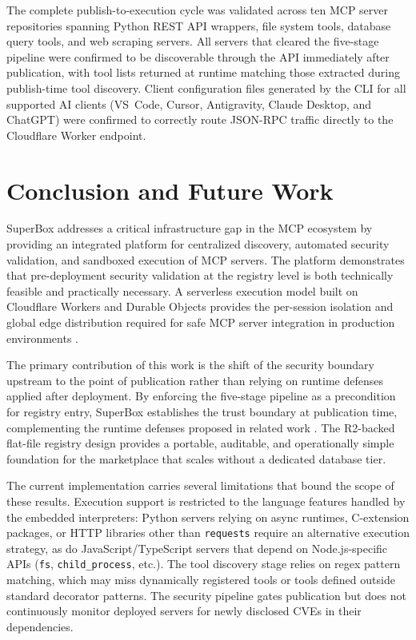 \documentclass[conference]{IEEEtran}
\begin{document}
The complete publish-to-execution cycle was validated across ten MCP
server repositories spanning Python REST API wrappers, file system
tools, database query tools, and web scraping servers.
All servers that cleared the five-stage pipeline were confirmed to be
discoverable through the API immediately after publication, with tool
lists returned at runtime matching those extracted during publish-time
tool discovery.
Client configuration files generated by the CLI for all supported AI
clients (VS~Code, Cursor, Antigravity, Claude Desktop, and ChatGPT)
were confirmed to correctly route JSON-RPC traffic directly to the
Cloudflare Worker endpoint.

\section{Conclusion and Future Work}
\label{sec:conclusion}

SuperBox addresses a critical infrastructure gap in the MCP ecosystem
by providing an integrated platform for centralized discovery, automated
security validation, and sandboxed execution of MCP servers.
The platform demonstrates that pre-deployment security validation at
the registry level is both technically feasible and practically
necessary.
A serverless execution model built on Cloudflare Workers and Durable
Objects provides the per-session isolation and global edge distribution
required for safe MCP server integration in production
environments \cite{jonas2019}.

The primary contribution of this work is the shift of the security
boundary upstream to the point of publication rather than relying on
runtime defenses applied after deployment.
By enforcing the five-stage pipeline as a precondition for registry
entry, SuperBox establishes the trust boundary at publication time,
complementing the runtime defenses proposed in related
work \cite{jamshidi2025,narajala2025}.
The R2-backed flat-file registry design provides a portable, auditable,
and operationally simple foundation for the marketplace that scales
without a dedicated database tier.

The current implementation carries several limitations that bound the
scope of these results.
Execution support is restricted to the language features handled by the
embedded interpreters: Python servers relying on async runtimes,
C-extension packages, or HTTP libraries other than \texttt{requests}
require an alternative execution strategy, as do JavaScript/TypeScript
servers that depend on Node.js-specific APIs (\texttt{fs},
\texttt{child\_process}, etc.).
The tool discovery stage relies on regex pattern matching, which may
miss dynamically registered tools or tools defined outside standard
decorator patterns.
The security pipeline gates publication but does not continuously
monitor deployed servers for newly disclosed CVEs in their dependencies.
\end{document}
